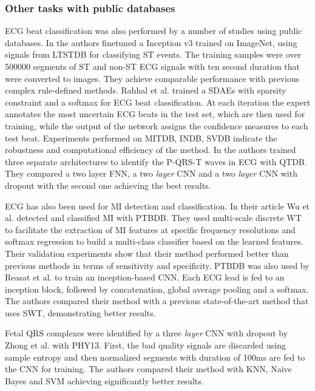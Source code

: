 \documentclass[journal]{IEEEtran}
\begin{document}
\subsubsection{Other tasks with public databases}
ECG beat classification was also performed by a number of studies using public databases.
In\cite{xiao2018monitoring} the authors finetuned a Inception v3 trained on ImageNet, using signals from LTSTDB for classifying ST events.
The training samples were over 500000 segments of ST and non-ST ECG signals with ten second duration that were converted to images.
They achieve comparable performance with previous complex rule-defined methods.
Rahhal et al.\cite{al2016deep} trained a SDAEs with sparsity constraint and a softmax for ECG beat classification.
At each iteration the expert annotates the most uncertain ECG beats in the test set, which are then used for training, while the output of the network assigns the confidence measures to each test beat.
Experiments performed on MITDB, INDB, SVDB indicate the robustness and computational efficiency of the method.
In\cite{abrishami2018p} the authors trained three separate architectures to identify the P-QRS-T waves in ECG with QTDB\@.
They compared a two layer FNN, a two \textit{layer} CNN and a two \textit{layer} CNN with dropout with the second one achieving the best results.

ECG has also been used for MI detection and classification.
In their article Wu et al.\cite{wu2016myocardial} detected and classified MI with PTBDB\@.
They used multi-scale discrete WT to facilitate the extraction of MI features at specific frequency resolutions and softmax regression to build a multi-class classifier based on the learned features.
Their validation experiments show that their method performed better than previous methods in terms of sensitivity and specificity.
PTBDB was also used by Reasat et al.\cite{reasat2017detection} to train an inception-based CNN\@.
Each ECG lead is fed to an inception block, followed by concatenation, global average pooling and a softmax.
The authors compared their method with a previous state-of-the-art method that uses SWT, demonstrating better results.

Fetal QRS complexes were identified by a three \textit{layer} CNN with dropout by Zhong et al.\cite{zhong2018deep} with PHY13.
First, the bad quality signals are discarded using sample entropy and then normalized segments with duration of 100ms are fed to the CNN for training.
The authors compared their method with KNN, Naive Bayes and SVM achieving significantly better results.
\end{document}
